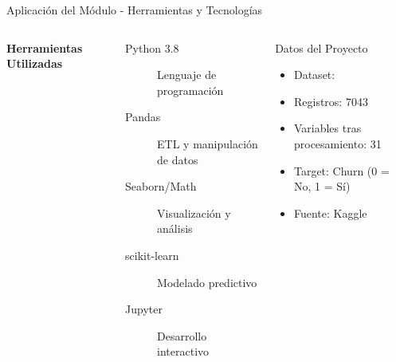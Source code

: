 
\begin{frame}{Aplicación del Módulo - Herramientas y Tecnologías}
    \begin{columns}[t]
        \textbf{Herramientas Utilizadas}
        \begin{description}
            \item[Python 3.8] Lenguaje de programación
            \item[Pandas] ETL y manipulación de datos
            \item[Seaborn/Math] Visualización y análisis
            \item[scikit-learn] Modelado predictivo
            \item[Jupyter] Desarrollo interactivo
        \end{description}
        
        \begin{block}{Datos del Proyecto}
            \begin{itemize}
                \item Dataset: \datasetname
                \item Registros: 7043
                \item Variables tras procesamiento: 31
                \item Target: Churn (0 = No, 1 = Sí)
                \item Fuente: Kaggle
            \end{itemize}
        \end{block}
    \end{columns}
    

\end{frame}
